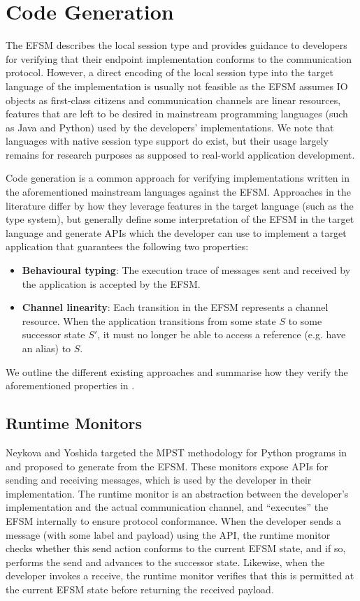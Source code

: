 \section{Code Generation}
The EFSM describes the local session type and provides guidance to developers for verifying that their endpoint implementation conforms to the communication protocol. However, a direct encoding of the local session type into the target language of the implementation is usually not feasible as the EFSM assumes IO objects as first-class citizens and communication channels are linear resources, features that are left to be desired in mainstream programming languages (such as Java and Python) used by the developers' implementations. We note that languages with native session type support \cite{ATS2016} do exist, but their usage largely remains for research purposes as supposed to real-world application development.

Code generation is a common approach for verifying implementations written in the aforementioned mainstream languages against the EFSM. Approaches in the literature differ by how they leverage features in the target language (such as the type system), but generally define some interpretation of the EFSM in the target language and generate APIs which the developer can use to implement a target application that guarantees the following two properties:

\begin{itemize}
\item \textbf{Behavioural typing}: The execution trace of messages sent and received by the application is accepted by the EFSM.
\item \textbf{Channel linearity}: Each transition in the EFSM represents a channel resource. When the application transitions from some state $S$ to some successor state $S'$, it must no longer be able to access a reference (e.g. have an alias) to $S$.
\end{itemize}

We outline the different existing approaches and summarise how they verify the aforementioned properties in \mathref{\ref{section:codegencompare}}.

\subsection{Runtime Monitors}
Neykova and Yoshida targeted the MPST methodology for Python programs in \cite{Python2017} and proposed to generate  from the EFSM. These monitors expose APIs for sending and receiving messages, which is used by the developer in their implementation. The runtime monitor is an abstraction between the developer's implementation and the actual communication channel, and ``executes'' the EFSM internally to ensure protocol conformance. When the developer sends a message (with some label and payload) using the API, the runtime monitor checks whether this send action conforms to the current EFSM state, and if so, performs the send and advances to the successor state. Likewise, when the developer invokes a receive, the runtime monitor verifies that this is permitted at the current EFSM state before returning the received payload.

